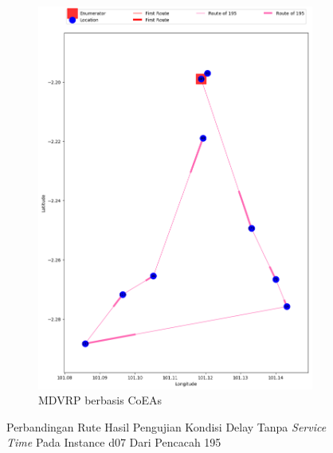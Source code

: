\begin{figure}[H]
	\centering
	\begin{subfigure}[t]{\textwidth}
		\centering
		\includegraphics[width=\textwidth]{Resources/Images/delayed_7/real_m15_n100_delayed_7_195_coes}
		\caption{MDVRP berbasis CoEAs}
		\label{fig:real_m15_n100_delayed_7_195_coes}
	\end{subfigure}
	\caption{Perbandingan Rute Hasil Pengujian Kondisi Delay Tanpa \textit{Service Time} Pada Instance d07 Dari Pencacah 195}
	\label{fig:real_m15_n100_delayed_7_195}
\end{figure}



